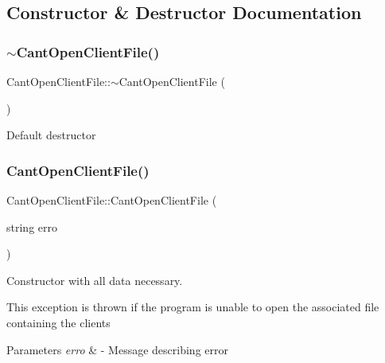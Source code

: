 \subsection{Constructor \& Destructor Documentation}
\mbox{\label{class_cant_open_client_file_a2185647136543071c3c98199486caf36}} 
\subsubsection{\texorpdfstring{$\sim$\+Cant\+Open\+Client\+File()}{~CantOpenClientFile()}}
{\footnotesize\ttfamily Cant\+Open\+Client\+File\+::$\sim$\+Cant\+Open\+Client\+File (\begin{DoxyParamCaption}{ }\end{DoxyParamCaption})}

Default destructor \mbox{\label{class_cant_open_client_file_a6190eccfaac3cb2f65f3cfd000ed5fb6}} 
\subsubsection{\texorpdfstring{Cant\+Open\+Client\+File()}{CantOpenClientFile()}}
{\footnotesize\ttfamily Cant\+Open\+Client\+File\+::\+Cant\+Open\+Client\+File (\begin{DoxyParamCaption}\item[{string}]{erro }\end{DoxyParamCaption})\hspace{0.3cm}{\ttfamily [inline]}}



Constructor with all data necessary. 

This exception is thrown if the program is unable to open the associated file containing the clients


\begin{DoxyParams}{Parameters}
{\em erro} & -\/ Message describing error \\
\hline
\end{DoxyParams}


